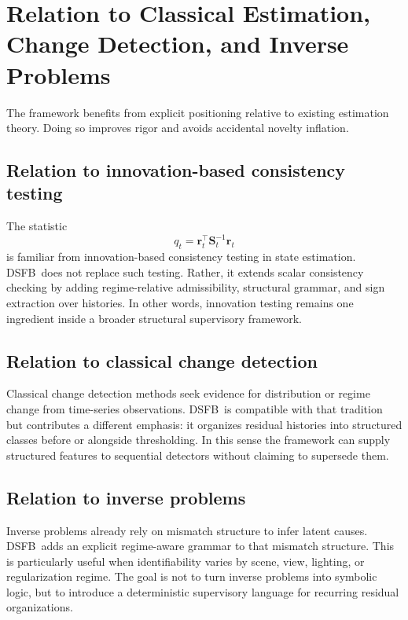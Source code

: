 \documentclass[11pt]{article}
\newcommand{\dsfb}{\textsc{DSFB}}
\newcommand{\resid}{\mathbf{r}}
\newcommand{\innov}{\mathbf{S}}
\theoremstyle{definition}
\theoremstyle{plain}
\begin{document}
\section{Relation to Classical Estimation, Change Detection, and Inverse Problems}

The framework benefits from explicit positioning relative to existing estimation theory. Doing so improves rigor and avoids accidental novelty inflation.

\subsection{Relation to innovation-based consistency testing}
The statistic
\begin{equation}
    q_t = \resid_t^\top \innov_t^{-1}\resid_t
\end{equation}
is familiar from innovation-based consistency testing in state estimation. \dsfb\ does not replace such testing. Rather, it extends scalar consistency checking by adding regime-relative admissibility, structural grammar, and sign extraction over histories. In other words, innovation testing remains one ingredient inside a broader structural supervisory framework.

\subsection{Relation to classical change detection}
Classical change detection methods seek evidence for distribution or regime change from time-series observations. \dsfb\ is compatible with that tradition but contributes a different emphasis: it organizes residual histories into structured classes before or alongside thresholding. In this sense the framework can supply structured features to sequential detectors without claiming to supersede them.

\subsection{Relation to inverse problems}
Inverse problems already rely on mismatch structure to infer latent causes. \dsfb\ adds an explicit regime-aware grammar to that mismatch structure. This is particularly useful when identifiability varies by scene, view, lighting, or regularization regime. The goal is not to turn inverse problems into symbolic logic, but to introduce a deterministic supervisory language for recurring residual organizations.
\end{document}
